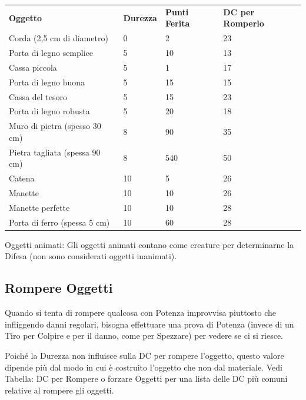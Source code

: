 \documentclass[a4paper,11pt,twoside,openany]{book}
\begin{document}
\bigskip

\begin{tabular}{llll}
	\toprule
	\textbf{Oggetto}& \textbf{Durezza} & \textbf{Punti Ferita} & \textbf{DC per Romperlo}\\
	Corda (2,5 cm di diametro)     & 0      & 2           & 23\\
	Porta di legno semplice        & 5      & 10          & 13\\
	Cassa piccola                  & 5      & 1           & 17\\
	Porta di legno buona           & 5      & 15          & 15\\
	Cassa del tesoro               & 5      & 15          & 23\\
	Porta di legno robusta         & 5      & 20          & 18\\
	Muro di pietra (spesso 30 cm)  & 8      & 90          & 35\\
	Pietra tagliata (spessa 90 cm) & 8      & 540         & 50\\
	Catena                         & 10     & 5           & 26\\
	Manette                        & 10     & 10          & 26\\
	Manette perfette               & 10     & 10          & 28\\
	Porta di ferro (spessa 5 cm)   & 10     & 60          & 28\\
\end{tabular}

\bigskip

Oggetti animati: Gli oggetti animati contano come creature per determinarne la Difesa (non sono considerati oggetti inanimati).

\subsection{Rompere Oggetti}

\label{rompere-oggetti}

Quando si tenta di rompere qualcosa con Potenza improvvisa piuttosto che infliggendo danni regolari, bisogna effettuare una prova di Potenza (invece di un Tiro per Colpire e per il danno, come per Spezzare) per vedere se ci si riesce.

Poiché la Durezza non influisce sulla DC per rompere l'oggetto, questo valore dipende più dal modo in cui è costruito l'oggetto che non dal materiale. Vedi Tabella: DC per Rompere o forzare Oggetti per una lista delle DC più comuni relative al rompere gli oggetti.
\end{document}
